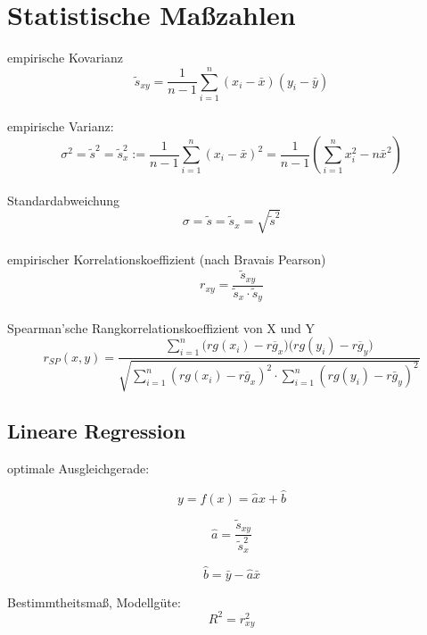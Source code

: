 \documentclass[a4paper]{article}
\begin{document}
\section{Statistische Maßzahlen}

empirische Kovarianz
\begin{displaymath}
    \tilde{s}_{xy} = \frac{1}{n-1} \sum^n_{i=1} (x_{i}-\bar{x}) (y_{i}-\bar{y})
\end{displaymath} \\

empirische Varianz:
\begin{displaymath}
  \sigma^2 = \tilde{s}^2 = \tilde{s}^2_x := \frac{1}{n-1} \sum^{n}_{i=1} (x_{i} - \bar{x})^2 = \frac{1}{n-1}(\sum^n_{i=1} x^2_i -n \bar x^2)
\end{displaymath} \\

Standardabweichung
\begin{displaymath}
  \sigma = \tilde s = \tilde s_x = \sqrt{\tilde s ^2}
\end{displaymath} \\

empirischer Korrelationskoeffizient (nach Bravais Pearson)
\begin{displaymath}
 r_{xy} = \frac{\tilde s_{xy}}{\tilde s_x \cdot \tilde s_y}
\end{displaymath} \\


Spearman'sche Rangkorrelationskoeffizient von X und Y
\begin{equation}
  r_{SP}(x,y) = \frac
  {\sum\limits^n_{i=1} \Big(rg(x_i) - \overline{rg_x}) (rg(y_i)- \overline{rg_y} \Big) }
  { \sqrt{ \sum\limits^n_{i=1} (rg(x_i) - \bar{rg_x})^2 \cdot \sum\limits^n_{i=1} (rg(y_i) - \bar{rg_y})^2 }}
\end{equation}

\subsection{Lineare Regression}
optimale Ausgleichgerade:

\begin{displaymath}
    y = f(x) = \hat a x + \hat b
\end{displaymath}

\begin{displaymath}
    \hat a = \frac{\tilde s_{xy}}{\tilde s^2_x}
\end{displaymath}

\begin{displaymath}
    \hat b = \bar y - \hat a \bar x
\end{displaymath}

Bestimmtheitsmaß, Modellgüte:
\begin{displaymath}
  R^2 = r^2_{xy}
\end{displaymath}
\end{document}
